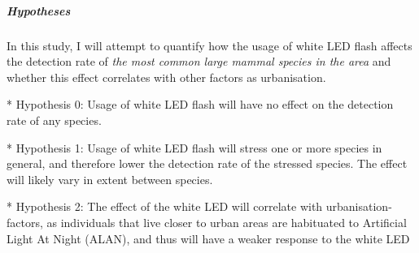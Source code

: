 \subparagraph{Hypotheses}
In this study, I will attempt to quantify how the usage of white LED flash affects the detection rate of \textsl{the most common large mammal species in the area} and whether this effect correlates with other factors as urbanisation.

* Hypothesis 0: Usage of white LED flash will have no effect on the detection rate of any species.

* Hypothesis 1: Usage of white LED flash will stress one or more species in general, and therefore lower the detection rate of the stressed species. The effect will likely vary in extent between species.

* Hypothesis 2: The effect of the white LED will correlate with urbanisation-factors, as individuals that live closer to urban areas are habituated to Artificial Light At Night (ALAN), and thus will have a weaker response to the white LED


